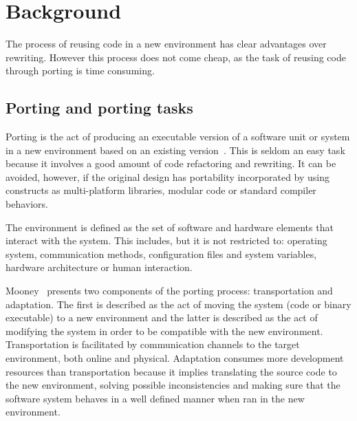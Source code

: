 \section{Background} \label{sec:background}

The process of reusing code in a new environment has clear advantages over
rewriting. However this process does not come cheap, as the task of reusing code
through porting is time consuming.

\subsection{Porting and porting tasks}

Porting is the act of producing an executable version of a software unit or
system in a new environment based on an existing
version~\cite{mooney1990strategies}. This is
seldom an easy task because it involves a good amount of code refactoring and
rewriting. It can be avoided, however, if the original design has portability
incorporated by using constructs as multi-platform libraries, modular code or
standard compiler behaviors.

The environment is defined as the set of software and hardware elements that
interact with the system. This includes, but it is not restricted to: operating
system, communication methods, configuration files and system variables,
hardware architecture or human interaction. 

Mooney~\cite{mooney1990strategies} presents two components of the porting process: transportation
and adaptation. The first is described as the act of moving the system (code or
binary executable) to a new environment and the latter is described as the act
of modifying the system in order to be compatible with the new environment.
Transportation is facilitated by communication channels to the target
environment, both online and physical. Adaptation consumes more development
resources than transportation because it implies translating the source code to
the new environment, solving possible inconsistencies and making sure that the
software system behaves in a well defined manner when ran in the new
environment.

